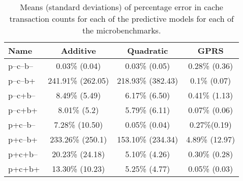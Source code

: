 \begin{table}
\small
\begin{tabular}{|l|c|c|c|}
\hline
Name & Additive & Quadratic & GPRS \\ \hline
 p--c--b-- & 0.03\% (0.04) & 0.03\% (0.05) & 0.28\% (0.36) \\ \hline
 p--c--b+ & 241.91\% (262.05)  & 218.93\% (382.43) &  0.1\% (0.07) \\ \hline
 p--c+b-- & 8.49\% (5.49) & 6.17\% (6.50) & 0.41\% (1.13) \\ \hline
 p--c+b+ & 8.01\% (5.2)  & 5.79\% (6.11) & 0.07\% (0.06) \\ \hline
 p+c--b-- & 7.28\% (10.50)  & 0.05\% (0.04) & 0.27\%(0.19) \\ \hline
 p+c--b+ & 233.26\% (250.1) & 153.10\% (234.34) &  4.89\% (12.97)\\ \hline
 p+c+b-- & 20.23\% (24.18)  & 5.10\% (4.26) &  0.30\% (0.28) \\ \hline
 p+c+b+ & 13.30\% (10.23)  & 5.25\% (4.77)  & 0.05\% (0.03) \\ \hline
  \end{tabular}
 \caption{Means (standard deviations) of percentage error in cache transaction counts for each of the predictive models for each of the microbenchmarks.}
\label{table:acc-cache}
\end{table}

